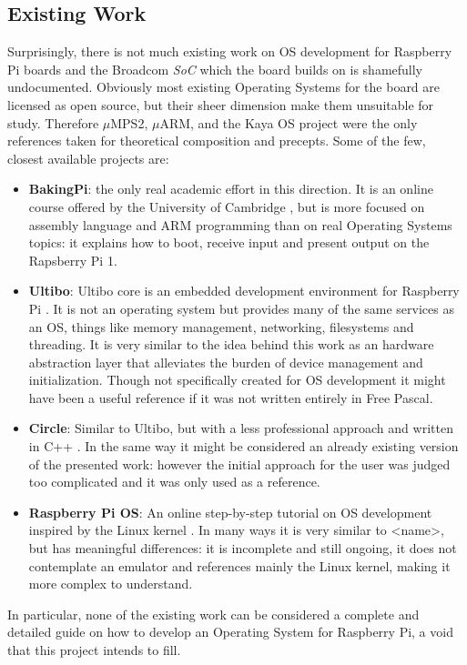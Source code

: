 \documentclass[12pt,a4paper,openright,twoside]{report}
\begin{document}
\subsection{Existing Work}
Surprisingly, there is not much existing work on OS development for Raspberry Pi 
boards and the Broadcom \textit{SoC} which the board builds on is shamefully undocumented. 
Obviously most existing
Operating Systems for the board are licensed as open source, but their sheer
dimension make them unsuitable for study.
Therefore $\mu$MPS2, $\mu$ARM, and the Kaya OS project were the only references
taken for theoretical composition and precepts.
Some of the few, closest available projects are:
\begin{itemize}
    \item \textbf{BakingPi}: the only real academic effort in this direction. It is an
        online course offered by the University of Cambridge \cite{bakingpi}, 
        but is more focused on assembly language and ARM programming than on real
        Operating Systems topics: it explains how to boot, receive input and present
        output on the Rapsberry Pi 1.
    \item \textbf{Ultibo}: Ultibo core is an embedded development environment 
        for Raspberry Pi \cite{ultibo}. It is not an operating system but provides many of 
        the same services as an OS, things like memory management, networking, 
        filesystems and threading. It is very similar to the idea behind this work
        as an hardware abstraction layer that alleviates the burden of device
        management and initialization. Though not specifically created for 
        OS development it might have been a useful reference if it was not
        written entirely in Free Pascal.
    \item \textbf{Circle}: Similar to Ultibo, but with a less professional approach
        and written in C++ \cite{circle}. In the same way it might be considered an already
        existing version of the presented work: however the initial approach 
        for the user was judged too complicated and it was only used as a reference.
    \item \textbf{Raspberry Pi OS}: An online step-by-step tutorial on OS development
        inspired by the Linux kernel \cite{raspberrypios}. In many ways it is very
        similar to <name>, but has meaningful differences: it is incomplete and
        still ongoing, it does not contemplate an emulator and references mainly
        the Linux kernel, making it more complex to understand.
\end{itemize}
In particular, none of the existing work can be considered a complete and detailed
guide on how to develop an Operating System for Raspberry Pi, a void that this
project intends to fill.
\end{document}
